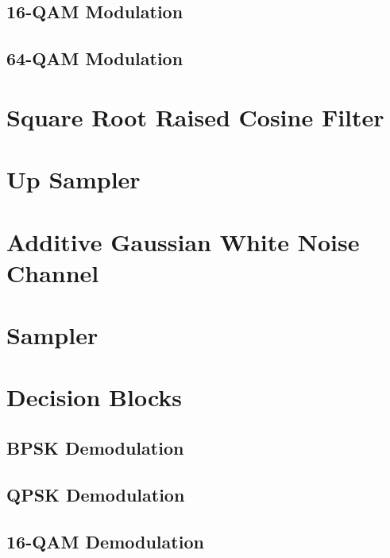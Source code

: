 \documentclass[]{article}
\begin{document}
\subsection{16-QAM Modulation}
\label{app:qam_16_mod}



\subsection{64-QAM Modulation }
\label{app:qam_64_mod}


\newpage
\section{Square Root Raised Cosine Filter}
\label{app:sqrt_raised_cosine}



\section{Up Sampler}
\label{app:impulse_train}


\section{Additive Gaussian White Noise Channel}
\label{app:awgn_channel}


\newpage
\section{Sampler}
\label{app:sampler}



\section{Decision Blocks}
\label{app:dblocks}
\subsection{BPSK Demodulation}
\label{app:bpsk_demod}


\newpage
\subsection{QPSK Demodulation}
\label{app:qpsk_demod}


\subsection{16-QAM Demodulation}
\label{app:qam_16_demod}

\end{document}

